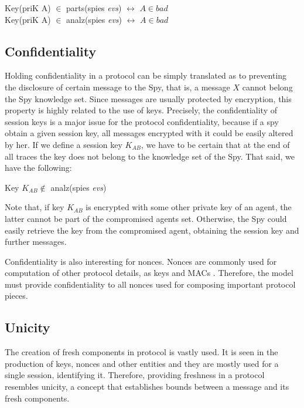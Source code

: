 \begin{center}
  Key(priK A) $\in$ parts(spies \textit{evs}) $\leftrightarrow$ $A \in bad$ \\
  Key(priK A) $\in$ analz(spies \textit{evs}) $\leftrightarrow$ $A \in bad$
\end{center}

\subsection{Confidentiality}
Holding confidentiality in a protocol can be simply translated as to preventing the disclosure of certain message to the Spy, that is, a message $X$ cannot belong the Spy knowledge set. Since messages are usually protected by encryption, this property is highly related to the use of keys. Precisely, the confidentiality of session keys is a major issue for the protocol confidentiality, because if a spy obtain a given session key, all messages encrypted with it could be easily altered by her. If we define a session key $K_{AB}$, we have to be certain that at the end of all traces the key does not belong to the knowledge set of the Spy. That said, we have the following:

\begin{center}
  Key $K_{AB} \notin$ analz(spies \textit{evs})
\end{center}

Note that, if key $K_{AB}$ is encrypted with some other private key of an agent, the latter cannot be part of the compromised agents set. Otherwise, the Spy could easily retrieve the key from the compromised agent, obtaining the session key and further messages.

Confidentiality is also interesting for nonces. Nonces are commonly used for computation of other protocol details, as keys and MACs \cite{bella-book}. Therefore, the model must provide confidentiality to all nonces used for composing important protocol pieces.


\subsection{Unicity}
The creation of fresh components in protocol is vastly used. It is seen in the production of keys, nonces and other entities and they are mostly used for a single session, identifying it. Therefore, providing freshness in a protocol resembles unicity, a concept that establishes bounds between a message and its fresh components.

